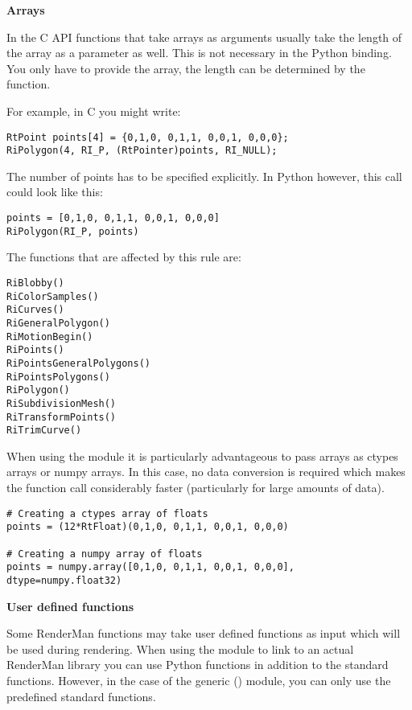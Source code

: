 {\bf Arrays}

In the C API functions that take arrays as arguments usually take the
length of the array as a parameter as well. This is not necessary in
the Python binding. You only have to provide the array, the length can
be determined by the function.

For example, in C you might write: 

\begin{verbatim}
RtPoint points[4] = {0,1,0, 0,1,1, 0,0,1, 0,0,0};
RiPolygon(4, RI_P, (RtPointer)points, RI_NULL); 
\end{verbatim}

The number of points has to be specified explicitly. In Python
however, this call could look like this:

\begin{verbatim}
points = [0,1,0, 0,1,1, 0,0,1, 0,0,0]
RiPolygon(RI_P, points) 
\end{verbatim}

The functions that are affected by this rule are: 

\begin{verbatim}
RiBlobby()
RiColorSamples()
RiCurves()
RiGeneralPolygon()
RiMotionBegin()
RiPoints()
RiPointsGeneralPolygons()
RiPointsPolygons()
RiPolygon()
RiSubdivisionMesh()
RiTransformPoints()
RiTrimCurve()
\end{verbatim}

When using the  module it is particularly advantageous to pass
arrays as ctypes arrays or numpy arrays. In this case, no data conversion is
required which makes the function call considerably faster (particularly for
large amounts of data).

\begin{verbatim}
# Creating a ctypes array of floats
points = (12*RtFloat)(0,1,0, 0,1,1, 0,0,1, 0,0,0)

# Creating a numpy array of floats
points = numpy.array([0,1,0, 0,1,1, 0,0,1, 0,0,0], dtype=numpy.float32)
\end{verbatim}

{\bf User defined functions}

Some RenderMan functions may take user defined functions as input
which will be used during rendering. When using the  module to
link to an actual RenderMan library you can use Python functions in
addition to the standard functions. However, in the case of the
generic () module, you can only use the predefined
standard functions.
 
